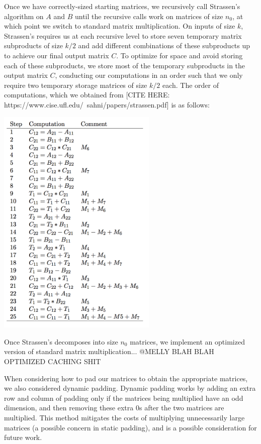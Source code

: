 \documentclass[a4paper]{article}
\begin{document}
Once we have correctly-sized starting matrices, we recursively call Strassen's algorithm on $A$ and $B$ until the recursive calls work on matrices of size $n_0$, at which point we switch to standard matrix multiplication. On inputs of size $k$, Strassen's requires us at each recursive level to store seven temporary matrix subproducts of size $k/2$ and add different combinations of these subproducts up to achieve our final output matrix $C$. To optimize for space and avoid storing each of these subproducts, we store most of the temporary subproducts in the output matrix $C$, conducting our computations in an order such that we only require two temporary storage matrices of size $k/2$ each. The order of computations, which we obtained from [CITE HERE: https://www.cise.ufl.edu/~sahni/papers/strassen.pdf] is as follows:
\begin{center}
\includegraphics[width=3in]{computations.png}
\end{center}

Once Strassen's decomposes into size $n_0$ matrices, we implement an optimized version of standard matrix multiplication... @MELLY BLAH BLAH OPTIMIZED CACHING SHIT

When considering how to pad our matrices to obtain the appropriate matrices, we also considered dynamic padding. Dynamic padding works by adding an extra row and column of padding only if the matrices being multiplied have an odd dimension, and then removing these extra 0s after the two matrices are multiplied. This method mitigates the costs of multiplying unnecessarily large matrices (a possible concern in static padding), and is a possible consideration for future work.
\end{document}
